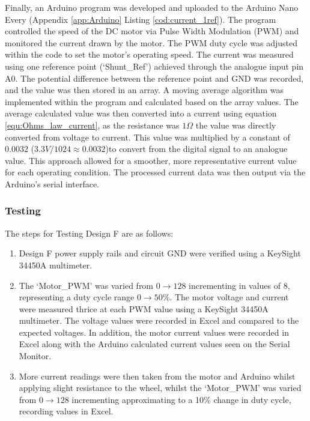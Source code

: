 Finally, an Arduino program was developed and uploaded to the Arduino Nano Every (Appendix \ref{app:Arduino} Listing \ref{cod:current_1ref}). The program controlled the speed of the DC motor via Pulse Width Modulation (PWM) and monitored the current drawn by the motor. The PWM duty cycle was adjusted within the code to set the motor’s operating speed. The current was measured using one reference point (`Shunt\_Ref') achieved through the analogue input pin A0. The potential difference between the reference point and GND was recorded, and the value was then stored in an array. A moving average algorithm was implemented within the program and calculated based on the array values. The average calculated value was then converted into a current using equation \ref{equ:Ohms_law_current}, as the resistance was \(1\Omega\) the value was directly converted from voltage to current. This value was multiplied by a constant of \(0.0032\) (\(3.3V/1024\approx0.0032\))to convert from the digital signal to an analogue value. This approach allowed for a smoother, more representative current value for each operating condition. The processed current data was then output via the Arduino’s serial interface. 

\subsubsection{Testing}
The steps for Testing Design F are as follows:

\begin{enumerate}
    \item Design F power supply rails and circuit GND were verified using a KeySight 34450A multimeter.
    \item The `Motor\_PWM' was varied from \(0\rightarrow128\) incrementing in values of 8, representing a duty cycle range \(0\rightarrow50\%\). The motor voltage and current were measured thrice at each PWM value using a KeySight 34450A multimeter. The voltage values were recorded in Excel and compared to the expected voltages. In addition, the motor current values were recorded in Excel along with the Arduino calculated current values seen on the Serial Monitor.  
    \item More current readings were then taken from the motor and Arduino whilst applying slight resistance to the wheel, whilst the `Motor\_PWM' was varied from \(0\rightarrow128\) incrementing approximating to a 10\% change in duty cycle, recording values in Excel.
\end{enumerate}

